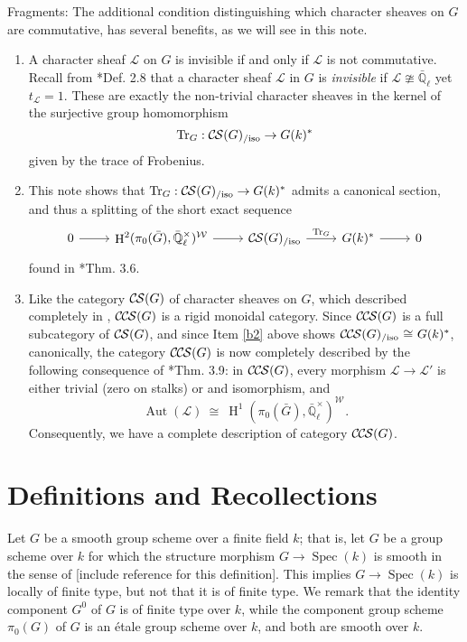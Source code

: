 \documentclass[10pt]{amsart}
\makeatletter
\theoremstyle{plain}
\theoremstyle{definition}
\newcommand{\EE}{\mathbb{\bar Q}_\ell}
\newcommand{\Fq}{k}
\newcommand{\EEx}{\EE^\times}
\newcommand{\Weil}[1]{\mathcal{W}_{#1}}
\DeclareMathOperator{\Aut}{Aut}
\DeclareMathOperator{\Hh}{H}
\newcommand{\Spec}[1]{{\operatorname{Spec}(#1)}}
\newcommand{\iso}{{\ \cong\ }}
\newcommand{\trFrob}[1]{t_{#1}}
\newcommand{\TrFrob}[1]{\operatorname{Tr}_{#1}}
\newcommand{\cs}[1]{{\mathcal{#1}}}
\newcommand{\CS}{{\mathcal{C\hskip-0.8pt S}}}
\newcommand{\CCS}{{\mathcal{C\hskip-.8pt C\hskip-0.8pt S}}}
\newcommand{\CSiso}[1]{\CS(#1)_{/\text{iso}}}
\newcommand{\CCSiso}[1]{\CCS(#1)_{/\text{iso}}}
\newcommand{\labitem}[2]{
\def\@itemlabel{\textbf{#1}}
\item
\def\@currentlabel{#1}\label{#2}}
\newcommand{\bG}{\bar{G}}
\makeatother
\begin{document}
Fragments: 
The additional condition distinguishing which character sheaves on $G$ are commutative, has several benefits, as we will see in this note.
\begin{enumerate}
\labitem{(1)}{b1}
A character sheaf $\cs{L}$ on $G$ is invisible if and only if $\cs{L}$ is not commutative.
Recall from \cite{cunningham-roe:13a}*{Def. 2.8} that a character sheaf $\cs{L}$ in $G$ is {\it invisible} if $\cs{L}  \ncong \EE$ yet $\trFrob{\cs{L}} =1$.
These are exactly the non-trivial character sheaves in the kernel of the surjective group homomorphism 
\[
\TrFrob{G} : \CSiso{G} \to G(\Fq)^*
\]
 given by the trace of Frobenius.
\labitem{(2)}{b2}
This note shows that $\TrFrob{G} : \CSiso{G} \to G(\Fq)^*$ admits a canonical section, and thus a splitting of the short exact sequence 
\[
\begin{tikzcd}
0 \arrow{r} & \Hh^2(\pi_0(\bG),\EEx)^{\Weil{}} \arrow{r} & \CSiso{G} \arrow{r}{\TrFrob{G}} & G(\Fq)^* \arrow{r} & 0
\end{tikzcd}
\]
found in \cite{cunningham-roe:13a}*{Thm. 3.6}.
\labitem{(3)}{b3}
Like the category $\CS(G)$ of character sheaves on $G$, which described completely in \cite{cunningham-roe:13a}, $\CCS(G)$ is a rigid monoidal category.
Since $\CCS(G)$ is a full subcategory of $\CS(G)$, and since Item \ref{b2} above shows $\CCSiso{G} \iso G(\Fq)^*$, canonically, the category $\CCS(G)$ is now completely described by the following consequence of \cite{cunningham-roe:13a}*{Thm. 3.9}: in $\CCS(G)$, every morphism $\cs{L} \to \cs{L}'$ is either trivial (zero on stalks) or and isomorphism, and
\[
\Aut(\cs{L}) \iso  \Hh^1(\pi_0(\bG), \EEx)^{\Weil{}}.
\]
Consequently, we have a complete description of category $\CCS(G)$.
\end{enumerate}




\section{Definitions and Recollections}

Let $G$ be a smooth group scheme over a finite field $\Fq$; that is, let $G$ be a group scheme over $\Fq$
for which the structure morphism $G \to \Spec{\Fq}$ is smooth in the sense of [include reference for this definition].
This implies $G \to \Spec{\Fq}$ is locally of finite type, but not that it is of finite type.
We remark that the identity component $G^0$ of $G$ is of finite type over $\Fq$, while the component group scheme
$\pi_0(G)$ of $G$ is an \'etale group scheme over $\Fq$, and both are smooth over $\Fq$.
\end{document}
